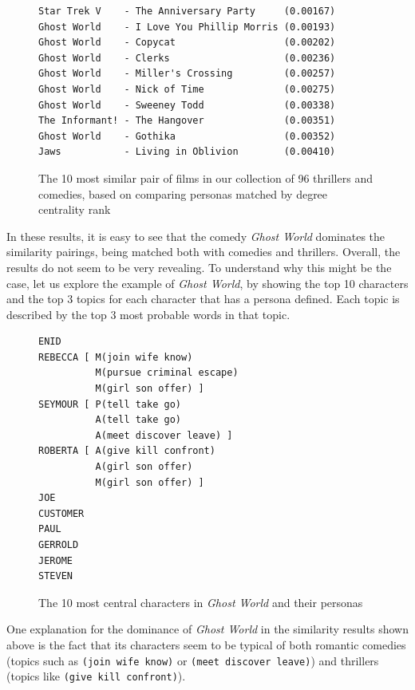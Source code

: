 \documentclass[bsc,frontabs,singlespacing,parskip]{infthesis} %
\begin{document}
\begin{figure}[h]
\centering
\begin{minipage}{11.5cm}
\begin{Verbatim}[frame=single]
Star Trek V    - The Anniversary Party     (0.00167)
Ghost World    - I Love You Phillip Morris (0.00193)
Ghost World    - Copycat                   (0.00202)
Ghost World    - Clerks                    (0.00236)
Ghost World    - Miller's Crossing         (0.00257)
Ghost World    - Nick of Time              (0.00275)
Ghost World    - Sweeney Todd              (0.00338)
The Informant! - The Hangover              (0.00351)
Ghost World    - Gothika                   (0.00352)
Jaws           - Living in Oblivion        (0.00410)
\end{Verbatim}
\end{minipage}
\caption{The 10 most similar pair of films in our collection of 96 thrillers and comedies, based on comparing personas matched by degree centrality rank}
\end{figure}

In these results, it is easy to see that the comedy \textit{Ghost World} dominates the similarity pairings, being matched both with comedies and thrillers. Overall, the results do not seem to be very revealing. To understand why this might be the case, let us explore the example of \textit{Ghost World}, by showing the top 10 characters and the top 3 topics for each character that has a persona defined. Each topic is described by the top 3 most probable words in that topic.

\begin{figure}[h]
\centering
\begin{minipage}{9cm}
\begin{Verbatim}[frame=single]
ENID 
REBECCA [ M(join wife know)
          M(pursue criminal escape)
          M(girl son offer) ]
SEYMOUR [ P(tell take go)
          A(tell take go)
          A(meet discover leave) ]
ROBERTA [ A(give kill confront)
          A(girl son offer)
          M(girl son offer) ]
JOE 
CUSTOMER 
PAUL 
GERROLD 
JEROME 
STEVEN 
\end{Verbatim}

\end{minipage}
\caption{The 10 most central characters in \textit{Ghost World} and their personas}
\end{figure}

One explanation for the dominance of \textit{Ghost World} in the similarity results shown above is the fact that its characters seem to be typical of both romantic comedies (topics such as \texttt{(join wife know)} or \texttt{(meet discover leave)}) and thrillers (topics like \texttt{(give kill confront)}).
\end{document}
